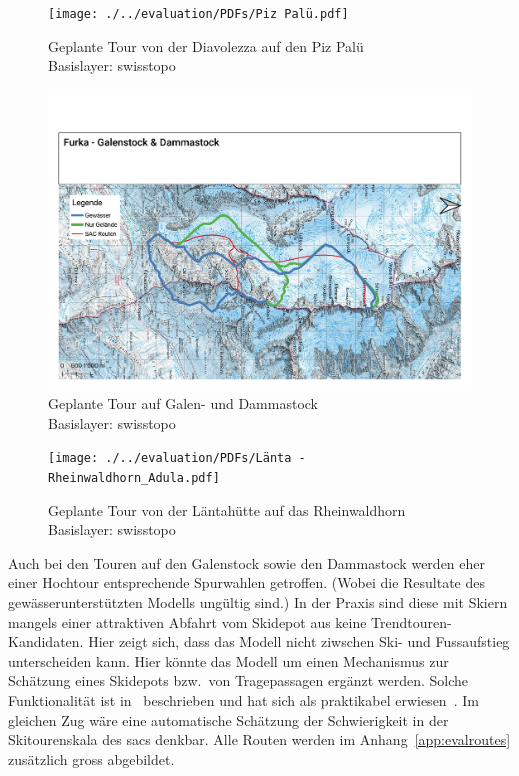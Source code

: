 \begin{figure}[ht]
  \centering
  \texttt{[image: ./../evaluation/PDFs/Piz Palü.pdf]}
  \caption{Geplante Tour von der Diavolezza auf den Piz Palü\\Basislayer: swisstopo}\label{fig:pizpalu}
\end{figure}
\begin{figure}[ht]
  \centering
  \includegraphics[page=1,width=.9\linewidth]{./../evaluation/PDFs/Furka - Galenstock & Dammastock.pdf}
  \caption{Geplante Tour auf Galen- und Dammastock\\Basislayer: swisstopo}\label{fig:pizpalu}
\end{figure}
\begin{figure}[ht]
  \centering
  \texttt{[image: ./../evaluation/PDFs/Länta - Rheinwaldhorn\_Adula.pdf]}
  \caption{Geplante Tour von der Läntahütte auf das Rheinwaldhorn\\Basislayer: swisstopo}\label{fig:pizpalu}
\end{figure}

Auch bei den Touren auf den Galenstock sowie den Dammastock werden eher einer Hochtour entsprechende Spurwahlen getroffen. (Wobei die Resultate des gewässerunterstützten Modells ungültig sind.) 
In der Praxis sind diese mit Skiern mangels einer attraktiven Abfahrt vom Skidepot aus keine Trendtouren-Kandidaten. Hier zeigt sich, dass das Modell nicht ziwschen Ski- und Fussaufstieg unterscheiden kann. Hier könnte das Modell um einen Mechanismus zur Schätzung eines Skidepots bzw.\ von Tragepassagen ergänzt werden. Solche Funktionalität ist in\ \citeauthor{footandcautionsection} beschrieben und hat sich als praktikabel erwiesen~\cite{footandcautionsection}. Im gleichen Zug wäre eine automatische Schätzung der Schwierigkeit in der Skitourenskala des \acrshort{sac}s denkbar. 
Alle Routen werden im Anhang\ \ref{app:evalroutes} zusätzlich gross abgebildet.


